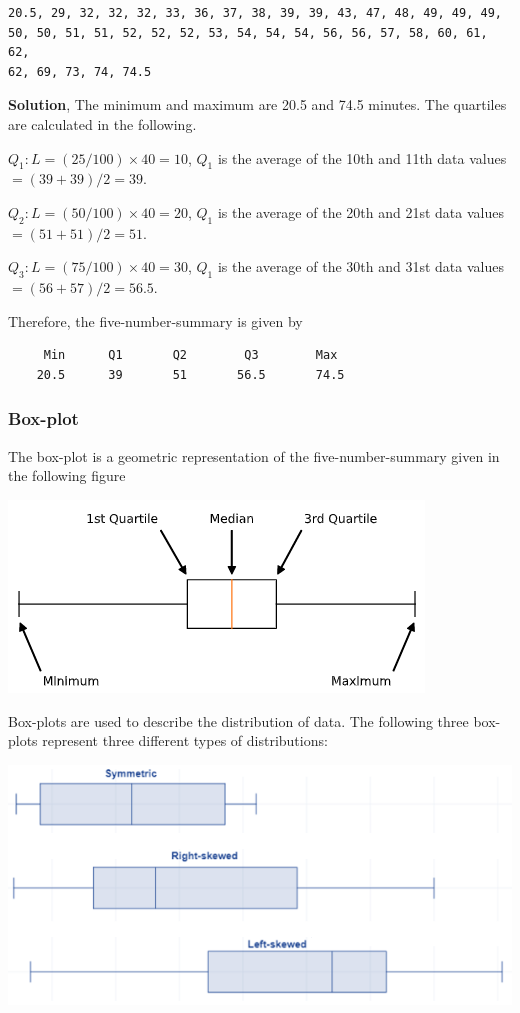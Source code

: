 \documentclass[
]{book}
\begin{document}
\begin{verbatim}
20.5, 29, 32, 32, 32, 33, 36, 37, 38, 39, 39, 43, 47, 48, 49, 49, 49, 
50, 50, 51, 51, 52, 52, 52, 53, 54, 54, 54, 56, 56, 57, 58, 60, 61, 62, 
62, 69, 73, 74, 74.5 
\end{verbatim}

\textbf{Solution}, The minimum and maximum are 20.5 and 74.5 minutes. The quartiles are calculated in the following.

\(Q_1: L = (25/100) \times 40 = 10\), \(Q_1\) is the average of the 10th and 11th data values \(= (39+39)/2 = 39\).

\(Q_2: L = (50/100) \times 40 = 20\), \(Q_1\) is the average of the 20th and 21st data values \(= (51 + 51)/2 = 51\).

\(Q_3: L = (75/100) \times 40 = 30\), \(Q_1\) is the average of the 30th and 31st data values \(= (56+57)/2 = 56.5\).

Therefore, the five-number-summary is given by

\begin{verbatim}
     Min      Q1       Q2        Q3        Max
    20.5      39       51       56.5       74.5
\end{verbatim}

\hypertarget{box-plot}{%
\subsubsection{Box-plot}\label{box-plot}}

The box-plot is a geometric representation of the five-number-summary given in the following figure

\begin{center}\includegraphics[width=0.6\linewidth]{week02/boxPlot} \end{center}

Box-plots are used to describe the distribution of data. The following three box-plots represent three different types of distributions:

\begin{center}\includegraphics[width=0.6\linewidth]{week02/interpretationBoxPlot} \end{center}
\end{document}
